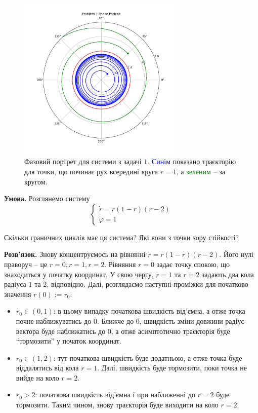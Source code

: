 \documentclass[oneside,solution]{tmpl}
\begin{document}
\begin{figure}
    \centering
    \includegraphics[width=0.7\textwidth]{images/hw_6/problem_1.pdf}
    \caption{Фазовий портрет для системи з задачі $1$. \textcolor{blue}{Синім} показано траєкторію для точки, що починає рух всередині круга $r=1$, а \textcolor{green}{зеленим} -- за кругом.}
    \label{fig:problem_1}
\end{figure}



\textbf{Умова.} Розглянемо систему
\begin{equation}
    \begin{cases}
        \dot{r} = r(1-r)(r-2) \\
        \dot{\varphi} = 1
    \end{cases}
\end{equation}

Скільки граничних циклів має ця система? Які вони з точки зору стійкості?

\textbf{Розв'язок.} Знову концентруємось на рівнянні $\dot{r}=r(1-r)(r-2)$. Його нулі праворуч -- це $r=0,r=1,r=2$. Рівняння $r=0$ задає точку спокою, що знаходиться у початку координат. У свою чергу, $r=1$ та $r=2$ задають два кола радіуса $1$ та $2$, відповідно. Далі, розглядаємо наступні проміжки для початково значення $r(0):=r_0$:
\begin{itemize}
    \item $r_0 \in (0,1)$: в цьому випадку початкова швидкість від'ємна, а отже точка почне наближуватись до $0$. Ближче до $0$, швидкість зміни довжини радіус-вектора буде наближатись до $0$, а отже асимптотично траєкторія буде ``тормозити'' у початок координат.
    \item $r_0 \in (1,2)$: тут початкова швидкість буде додатньою, а отже точка буде віддалятись від кола $r=1$. Далі, швидкість буде тормозити, поки точка не вийде на коло $r=2$.
    \item $r_0>2$: початкова швидкість від'ємна і при наближенні до $r=2$ буде тормозити. Таким чином, знову траєкторія буде виходити на коло $r=2$.
\end{itemize}
\end{document}
